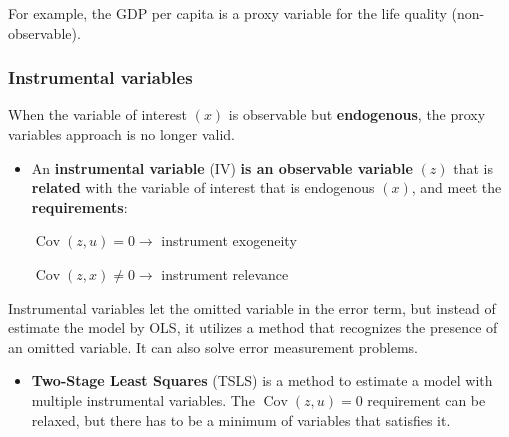 \documentclass[10pt, a4paper, landscape]{article}
\DeclareMathOperator{\Cov}{Cov}
\begin{document}
\begin{multicols}{3}
For example, the GDP per capita is a proxy variable for the life quality (non-observable).

\subsubsection*{Instrumental variables}

When the variable of interest \( (x) \) is observable but \textbf{endogenous}, the proxy variables approach is no longer valid.

\begin{itemize}[leftmargin=*]
	\item An \textbf{instrumental variable} (IV) \textbf{is an observable variable} \( (z) \) that is \textbf{related} with the variable of interest that is endogenous \( (x) \), and meet the \textbf{requirements}:
	\begin{center}
		\( \Cov(z, u) = 0 \rightarrow \) instrument exogeneity

		\( \Cov(z, x) \neq 0 \rightarrow \) instrument relevance
	\end{center}
\end{itemize}

Instrumental variables let the omitted variable in the error term, but instead of estimate the model by OLS, it utilizes a method that recognizes the presence of an omitted variable. It can also solve error measurement problems.

\begin{itemize}[leftmargin=*]
	\item \textbf{Two-Stage Least Squares} (TSLS) is a method to estimate a model with multiple instrumental variables. The \( \Cov(z, u) = 0 \) requirement can be relaxed, but there has to be a minimum of variables that satisfies it.


\end{itemize}
\end{multicols}
\end{document}

